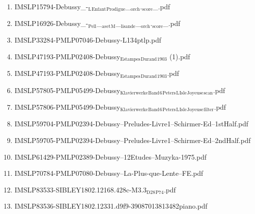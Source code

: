 \documentclass[11pt]{article}
\begin{document}
\begin{enumerate}
\item IMSLP15794-Debussy\_-$_{\text{L}}$$_{\text{Enfant}}$$_{\text{Prodigue}}$\_$_{\text{orch}}$.$_{\text{score}}$\_.pdf
\label{sec-1-1-1-1-44-23-15}

\item IMSLP16926-Debussy\_-$_{\text{Pell}}$\_$_{\text{as}}$$_{\text{et}}$$_{\text{M}}$\_$_{\text{lisande}}$\_$_{\text{orch}}$.$_{\text{score}}$\_.pdf
\label{sec-1-1-1-1-44-23-16}

\item IMSLP33284-PMLP07046-Debussy-L134ptlp.pdf
\label{sec-1-1-1-1-44-23-17}

\item IMSLP47193-PMLP02408-Debussy$_{\text{Estampes}}$$_{\text{Durand}}$$_{\text{1903}}$ (1).pdf
\label{sec-1-1-1-1-44-23-18}

\item IMSLP47193-PMLP02408-Debussy$_{\text{Estampes}}$$_{\text{Durand}}$$_{\text{1903}}$.pdf
\label{sec-1-1-1-1-44-23-19}

\item IMSLP57805-PMLP05499-Debussy$_{\text{Klavierwerke}}$$_{\text{Band}}$$_{\text{6}}$$_{\text{Peters}}$$_{\text{L}}$$_{\text{Isle}}$$_{\text{Joyeuse}}$$_{\text{scan}}$.pdf
\label{sec-1-1-1-1-44-23-20}

\item IMSLP57806-PMLP05499-Debussy$_{\text{Klavierwerke}}$$_{\text{Band}}$$_{\text{6}}$$_{\text{Peters}}$$_{\text{L}}$$_{\text{Isle}}$$_{\text{Joyeuse}}$$_{\text{filter}}$.pdf
\label{sec-1-1-1-1-44-23-21}

\item IMSLP59704-PMLP02394-Debussy--Preludes-Livre1--Schirmer-Ed--1stHalf.pdf
\label{sec-1-1-1-1-44-23-22}

\item IMSLP59705-PMLP02394-Debussy--Preludes-Livre1--Schirmer-Ed--2ndHalf.pdf
\label{sec-1-1-1-1-44-23-23}

\item IMSLP61429-PMLP02389-Debussy--12Etudes--Muzyka-1975.pdf
\label{sec-1-1-1-1-44-23-24}

\item IMSLP70784-PMLP07080-Debussy--La-Plus-que-Lente--FE.pdf
\label{sec-1-1-1-1-44-23-25}

\item IMSLP83533-SIBLEY1802.12168.428c-M3.3$_{\text{D28}}$$_{\text{P74}}$.pdf
\label{sec-1-1-1-1-44-23-26}

\item IMSLP83536-SIBLEY1802.12331.d9f9-39087013813482piano.pdf
\label{sec-1-1-1-1-44-23-27}
\end{enumerate}
\end{document}
